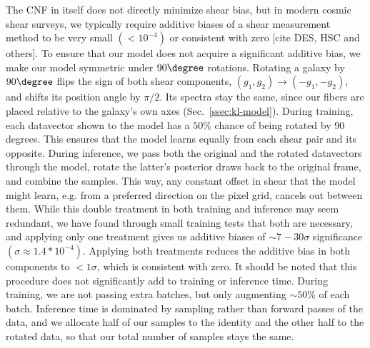 The CNF in itself does not directly minimize shear bias, but in modern cosmic shear surveys, we typically require additive biases of a shear measurement method to be very small $(<10^{-4})$ or consistent with zero [cite DES, HSC and others]. To ensure that our model does not acquire a significant additive bias, we make our model symmetric under $90\degree$ rotations. Rotating a galaxy by $90\degree$ flips the sign of both shear components, $(g_1, g_2) \rightarrow (-g_1, -g_2)$, and shifts its position angle by $\pi/2$. Its spectra stay the same, since our fibers are placed relative to the galaxy's own axes (Sec.~\ref{ssec:kl-model}). During training, each datavector shown to the model has a $50\%$ chance of being rotated by 90 degrees. This ensures that the model learns equally from each shear pair and its opposite. During inference, we pass both the original and the rotated datavectors through the model, rotate the latter's posterior draws back to the original frame, and combine the samples. This way, any constant offset in shear that the model might learn, e.g. from a preferred direction on the pixel grid, cancels out between them. While this double treatment in both training and inference may seem redundant, we have found through small training tests that both are necessary, and applying only one treatment gives us additive biases of $\sim7-30 \sigma$ significance $(\sigma\approx1.4*10^{-4})$. Applying both treatments reduces the additive bias in both components to $<1\sigma$, which is consistent with zero. It should be noted that this procedure does not significantly add to training or inference time. During training, we are not passing extra batches, but only augmenting $\sim50\%$ of each batch. Inference time is dominated by sampling rather than forward passes of the data, and we allocate half of our samples to the identity and the other half to the rotated data, so that our total number of samples stays the same.

